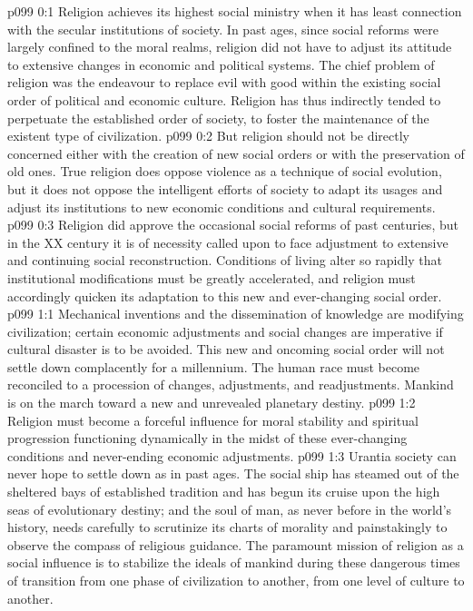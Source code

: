 \author{Melchizedek}
\vs p099 0:1 Religion achieves its highest social ministry when it has least connection with the secular institutions of society. In past ages, since social reforms were largely confined to the moral realms, religion did not have to adjust its attitude to extensive changes in economic and political systems. The chief problem of religion was the endeavour to replace evil with good within the existing social order of political and economic culture. Religion has thus indirectly tended to perpetuate the established order of society, to foster the maintenance of the existent type of civilization.
\vs p099 0:2 But religion should not be directly concerned either with the creation of new social orders or with the preservation of old ones. True religion does oppose violence as a technique of social evolution, but it does not oppose the intelligent efforts of society to adapt its usages and adjust its institutions to new economic conditions and cultural requirements.
\vs p099 0:3 Religion did approve the occasional social reforms of past centuries, but in the XX century it is of necessity called upon to face adjustment to extensive and continuing social reconstruction. Conditions of living alter so rapidly that institutional modifications must be greatly accelerated, and religion must accordingly quicken its adaptation to this new and ever\hyp{}changing social order.
\vs p099 1:1 Mechanical inventions and the dissemination of knowledge are modifying civilization; certain economic adjustments and social changes are imperative if cultural disaster is to be avoided. This new and oncoming social order will not settle down complacently for a millennium. The human race must become reconciled to a procession of changes, adjustments, and readjustments. Mankind is on the march toward a new and unrevealed planetary destiny.
\vs p099 1:2 \pc Religion must become a forceful influence for moral stability and spiritual progression functioning dynamically in the midst of these ever\hyp{}changing conditions and never\hyp{}ending economic adjustments.
\vs p099 1:3 \pc Urantia society can never hope to settle down as in past ages. The social ship has steamed out of the sheltered bays of established tradition and has begun its cruise upon the high seas of evolutionary destiny; and the soul of man, as never before in the world’s history, needs carefully to scrutinize its charts of morality and painstakingly to observe the compass of religious guidance. The paramount mission of religion as a social influence is to stabilize the ideals of mankind during these dangerous times of transition from one phase of civilization to another, from one level of culture to another.

